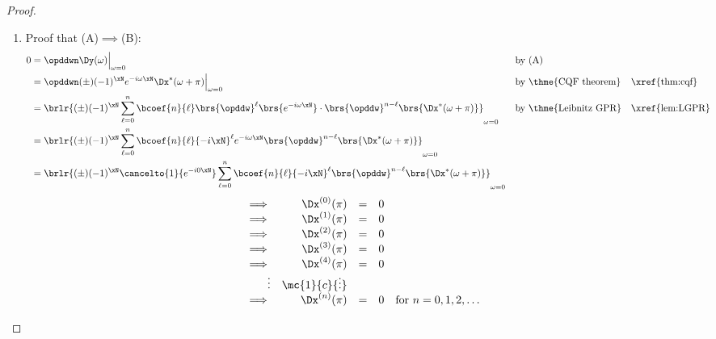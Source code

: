 \begin{proof}
\begin{enumerate}
  \item Proof that (A)$\implies$(B): 
    \begin{align*}
      0
        &= \opddwn\Dy(\omega)\Big|_{\omega=0}
        && \text{by (A)}
      \\&= \opddwn(\pm)(-1)^\xN e^{-i\omega\xN}\Dx^\ast(\omega+\pi)\Big|_{\omega=0}
        && \text{by \thme{CQF theorem}}
        && \text{\xref{thm:cqf}}
      \\&= \brlr{(\pm)(-1)^\xN \sum_{\ell=0}^n \bcoef{n}{\ell} \brs{\opddw}^\ell\brs{e^{-i\omega\xN}}\cdot\brs{\opddw}^{n-\ell}\brs{\Dx^\ast(\omega+\pi)}}_{\omega=0}
        && \text{by \thme{Leibnitz GPR}}
        && \text{\xref{lem:LGPR}}
      \\&= \brlr{(\pm)(-1)^\xN 
                 \sum_{\ell=0}^n \bcoef{n}{\ell} {-i\xN}^\ell e^{-i\omega\xN}\brs{\opddw}^{n-\ell}\brs{\Dx^\ast(\omega+\pi)}
                }_{\omega=0}
      \\&= \brlr{(\pm)(-1)^\xN  \cancelto{1}{e^{-i0\xN}} \sum_{\ell=0}^n \bcoef{n}{\ell} {-i\xN}^\ell \brs{\opddw}^{n-\ell}\brs{\Dx^\ast(\omega+\pi)}}_{\omega=0}
    \end{align*}
  \[\begin{array}{r rcl l}
    \implies & \Dx^{(0)}(\pi) &=& 0 \\
    \implies & \Dx^{(1)}(\pi) &=& 0 \\
    \implies & \Dx^{(2)}(\pi) &=& 0 \\
    \implies & \Dx^{(3)}(\pi) &=& 0 \\
    \implies & \Dx^{(4)}(\pi) &=& 0 \\
    \vdots   & \mc{1}{c}{\vdots}    \\
    \implies & \Dx^{(n)}(\pi) &=& 0 & \text{for $n=0,1,2,\ldots$}
  \end{array}\]


\end{enumerate}
\end{proof}
